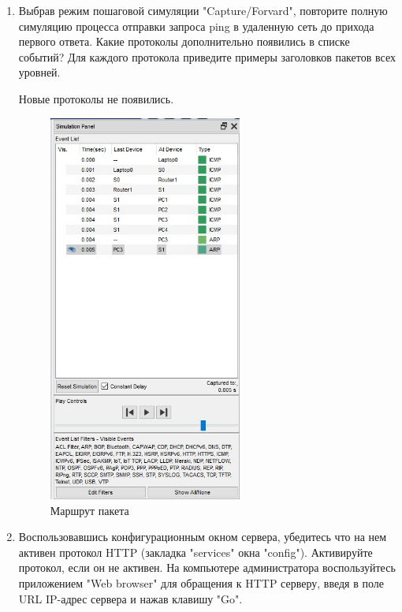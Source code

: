 \documentclass[bachelor, och, labwork]{shiza}
\begin{document}
\begin{enumerate}
    \item Выбрав режим пошаговой симуляции "Capture/Forvard", повторите полную симуляцию процесса отправки 
    запроса ping в удаленную сеть до прихода первого ответа. Какие протоколы дополнительно появились в 
    списке событий? Для каждого протокола приведите примеры заголовков пакетов всех уровней.

    Новые протоколы не появились.

    \begin{figure}[H]
        \centering      %
        \includegraphics[width=0.6\textwidth]{5}
        \caption{Маршрут пакета}
        \label{fig:image1}
    \end{figure}

    \item Воспользовавшись конфигурационным окном сервера, убедитесь что на нем активен протокол HTTP 
    (закладка "services" окна "config"). Активируйте протокол, если он не активен. На компьютере 
    администратора воспользуйтесь приложением "Web browser" для обращения к HTTP серверу, введя в поле 
    URL IP-адрес сервера и нажав клавишу "Go".


\end{enumerate}
\end{document}
